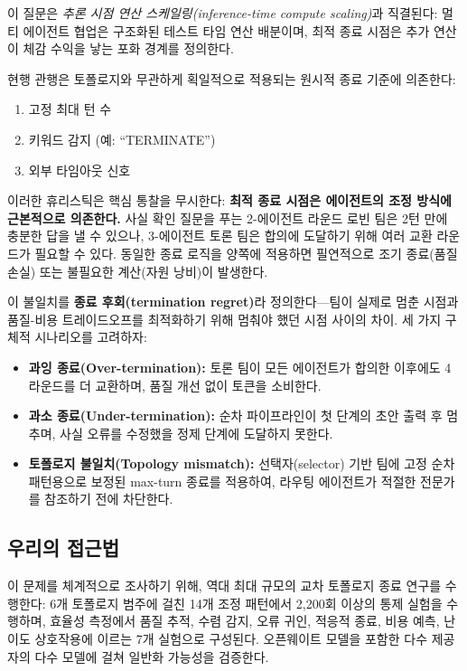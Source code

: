 \documentclass[a4paper,11pt]{article}
\begin{document}
이 질문은 \emph{추론 시점 연산 스케일링(inference-time compute scaling)}과 직결된다: 멀티 에이전트 협업은 구조화된 테스트 타임 연산 배분이며, 최적 종료 시점은 추가 연산이 체감 수익을 낳는 포화 경계를 정의한다.

현행 관행은 토폴로지와 무관하게 획일적으로 적용되는 원시적 종료 기준에 의존한다:
\begin{enumerate}[label=(\roman*)]
    \item 고정 최대 턴 수
    \item 키워드 감지 (예: ``TERMINATE'')
    \item 외부 타임아웃 신호
\end{enumerate}

이러한 휴리스틱은 핵심 통찰을 무시한다: \textbf{최적 종료 시점은 에이전트의 조정 방식에 근본적으로 의존한다.} 사실 확인 질문을 푸는 2-에이전트 라운드 로빈 팀은 2턴 만에 충분한 답을 낼 수 있으나, 3-에이전트 토론 팀은 합의에 도달하기 위해 여러 교환 라운드가 필요할 수 있다. 동일한 종료 로직을 양쪽에 적용하면 필연적으로 조기 종료(품질 손실) 또는 불필요한 계산(자원 낭비)이 발생한다.

이 불일치를 \textbf{종료 후회(termination regret)}라 정의한다---팀이 실제로 멈춘 시점과 품질-비용 트레이드오프를 최적화하기 위해 멈춰야 했던 시점 사이의 차이. 세 가지 구체적 시나리오를 고려하자:

\begin{itemize}
    \item \textbf{과잉 종료(Over-termination):} 토론 팀이 모든 에이전트가 합의한 이후에도 4라운드를 더 교환하며, 품질 개선 없이 토큰을 소비한다.
    \item \textbf{과소 종료(Under-termination):} 순차 파이프라인이 첫 단계의 초안 출력 후 멈추며, 사실 오류를 수정했을 정제 단계에 도달하지 못한다.
    \item \textbf{토폴로지 불일치(Topology mismatch):} 선택자(selector) 기반 팀에 고정 순차 패턴용으로 보정된 max-turn 종료를 적용하여, 라우팅 에이전트가 적절한 전문가를 참조하기 전에 차단한다.
\end{itemize}

\subsection{우리의 접근법}

이 문제를 체계적으로 조사하기 위해, 역대 최대 규모의 교차 토폴로지 종료 연구를 수행한다: 6개 토폴로지 범주에 걸친 14개 조정 패턴에서 2,200회 이상의 통제 실험을 수행하며, 효율성 측정에서 품질 추적, 수렴 감지, 오류 귀인, 적응적 종료, 비용 예측, 난이도 상호작용에 이르는 7개 실험으로 구성된다. 오픈웨이트 모델을 포함한 다수 제공자의 다수 모델에 걸쳐 일반화 가능성을 검증한다.
\end{document}
